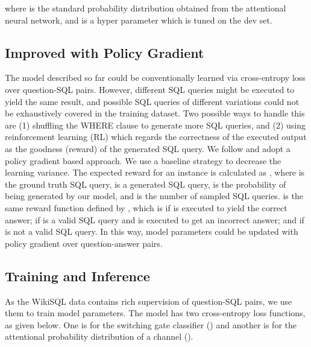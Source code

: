 \documentclass[11pt,a4paper]{article}
\begin{document}
where  is the standard probability distribution obtained from the attentional neural network, and  is a hyper parameter which is tuned on the dev set.




\subsection{Improved with Policy Gradient}
\label{section:improved-rl}
The model described so far could be conventionally learned via cross-entropy loss over question-SQL pairs.
However, different SQL queries might be executed to yield the same result, and possible SQL queries of different variations
could not be exhaustively covered in the training dataset.
Two possible ways to handle this are (1) shuffling the WHERE clause to generate more SQL queries, and (2) using 
reinforcement learning (\mbox{RL}) which 
regards the correctness of the executed output as the goodness (reward) of the generated SQL query.
We follow  and adopt a policy gradient based approach.
We use a baseline strategy \cite{zaremba2015reinforcement} to decrease the learning variance.
The expected reward \cite{williams1992simple} for an instance is calculated as , where  is the ground truth SQL query,  is a generated SQL query,  is the probability of  being generated by our model, and  is the number of sampled SQL queries.
 is the same reward function defined by , which is
 if  is executed to yield the correct answer;
 if  is a valid SQL query and is executed to get an incorrect answer;
and  if  is not a valid SQL query.
In this way, model parameters could be updated
with policy gradient over question-answer pairs.



\subsection{Training and Inference}
As the WikiSQL data contains rich supervision of question-SQL pairs, we use them to train model parameters.
The model has two cross-entropy loss functions, as given below.
One is for the switching gate classifier () and another is for the attentional probability distribution of a channel (). 
\end{document}
